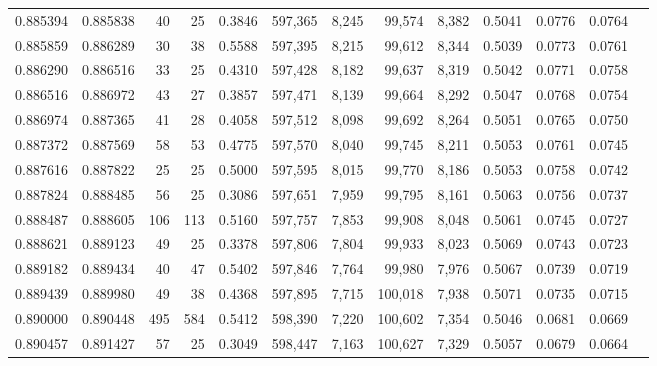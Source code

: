 \begin{tabular}{rrrrrrrrrrrrr}
0.885394 & 0.885838 &    40 &  25 &                                     0.3846 & 597,365 &   8,245 &  99,574 &   8,382 & 0.5041 & 0.0776 & 0.0764 \\
0.885859 & 0.886289 &    30 &  38 &                                     0.5588 & 597,395 &   8,215 &  99,612 &   8,344 & 0.5039 & 0.0773 & 0.0761 \\
0.886290 & 0.886516 &    33 &  25 &                                     0.4310 & 597,428 &   8,182 &  99,637 &   8,319 & 0.5042 & 0.0771 & 0.0758 \\
0.886516 & 0.886972 &    43 &  27 &                                     0.3857 & 597,471 &   8,139 &  99,664 &   8,292 & 0.5047 & 0.0768 & 0.0754 \\
0.886974 & 0.887365 &    41 &  28 &                                     0.4058 & 597,512 &   8,098 &  99,692 &   8,264 & 0.5051 & 0.0765 & 0.0750 \\
0.887372 & 0.887569 &    58 &  53 &                                     0.4775 & 597,570 &   8,040 &  99,745 &   8,211 & 0.5053 & 0.0761 & 0.0745 \\
0.887616 & 0.887822 &    25 &  25 &                                     0.5000 & 597,595 &   8,015 &  99,770 &   8,186 & 0.5053 & 0.0758 & 0.0742 \\
0.887824 & 0.888485 &    56 &  25 &                                     0.3086 & 597,651 &   7,959 &  99,795 &   8,161 & 0.5063 & 0.0756 & 0.0737 \\
0.888487 & 0.888605 &   106 & 113 &                                     0.5160 & 597,757 &   7,853 &  99,908 &   8,048 & 0.5061 & 0.0745 & 0.0727 \\
0.888621 & 0.889123 &    49 &  25 &                                     0.3378 & 597,806 &   7,804 &  99,933 &   8,023 & 0.5069 & 0.0743 & 0.0723 \\
0.889182 & 0.889434 &    40 &  47 &                                     0.5402 & 597,846 &   7,764 &  99,980 &   7,976 & 0.5067 & 0.0739 & 0.0719 \\
0.889439 & 0.889980 &    49 &  38 &                                     0.4368 & 597,895 &   7,715 & 100,018 &   7,938 & 0.5071 & 0.0735 & 0.0715 \\
0.890000 & 0.890448 &   495 & 584 &                                     0.5412 & 598,390 &   7,220 & 100,602 &   7,354 & 0.5046 & 0.0681 & 0.0669 \\
0.890457 & 0.891427 &    57 &  25 &                                     0.3049 & 598,447 &   7,163 & 100,627 &   7,329 & 0.5057 & 0.0679 & 0.0664 \\

\end{tabular}

